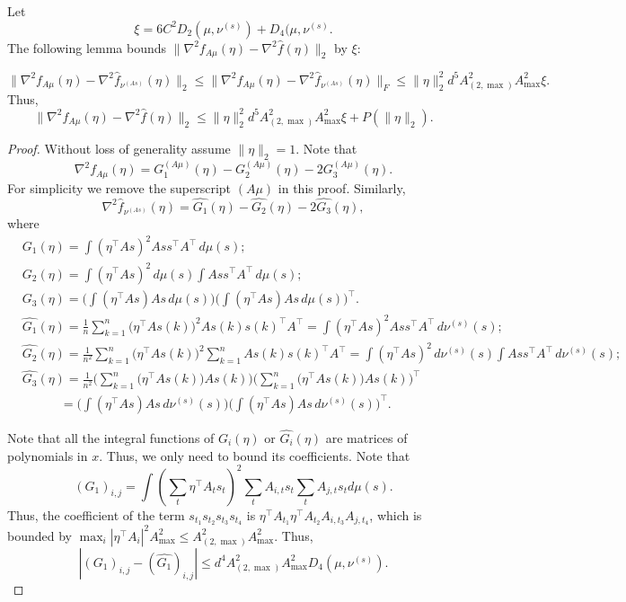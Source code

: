 Let 
\begin{equation}
\label{eq:xi}
\xi = 6C^2D_2(\mu, \nu^{(s)}) + D_4(\mu, \nu^{(s)}.
\end{equation}
The following lemma bounds $\|\nabla^2 f_{A\mu}(\eta) - \nabla^2 \hat{f}(\eta) \|_2$ by $\xi$:
\begin{lemma}
\label{lem:nablavariation}
\[
\|\nabla^2 f_{A\mu}(\eta) - \nabla^2 \widehat{f}_{\nu^{(As)}}(\eta)  \|_2 \le \|\nabla^2 f_{A\mu}(\eta) - \nabla^2 \widehat{f}_{\nu^{(As)}}(\eta)  \|_F\le  \|\eta\|_2^2  d^5 A_{(2,\max)}^2A_{\max}^2\xi.
\]
Thus, 
\[
\|\nabla^2 f_{A\mu}(\eta) - \nabla^2\widehat{f}(\eta)\|_2 \le  \|\eta\|_2^2  d^5 A_{(2,\max)}^2A_{\max}^2\xi + P(\|\eta\|_2).
\]
\end{lemma}
\begin{proof}
Without loss of generality assume $\|\eta\|_2 = 1$.
Note that  
\[
\nabla^2 f_{A\mu}(\eta) = G_1^{(A\mu)}(\eta) - G_2^{(A\mu)}(\eta) -2G_3^{(A\mu)}(\eta).
\]
For simplicity we remove the superscript $(A\mu)$ in this proof. Similarly,
\[
\nabla^2 \widehat{f}_{\nu^{(As)}}(\eta) =\widehat{G_1}(\eta) - \widehat{G_2}(\eta) -2\widehat{G_3}(\eta),
\]
where 
\begin{align*}
& G_1(\eta) = \int (\eta^{\top}As)^2Ass^{\top}A^{\top}\,d\mu(s); \\
& G_2(\eta) = \int (\eta^{\top}As)^2\,d\mu(s) \int Ass^{\top}A^{\top} \,d\mu(s); \\
& G_3(\eta) = \Big(\int (\eta^{\top}As)As\,d\mu(s)\Big)\Big(\int (\eta^{\top}As)As\,d\mu(s)\Big)^{\top}. \\
&\widehat{ G_1}(\eta) = \frac1n\sum_{k=1}^{n} \big(\eta^{\top}As(k)\big)^2As(k)s(k)^{\top}A^{\top} = \int (\eta^{\top}As)^2Ass^{\top}A^{\top}\,d\nu^{(s)}(s); \\
& \widehat{G_2}(\eta) = \frac{1}{n^2}\sum_{k=1}^{n} \big(\eta^{\top}As(k)\big)^2 \sum_{k=1}^{n}As(k)s(k)^{\top}A^{\top} = \int (\eta^{\top}As)^2\,d\nu^{(s)}(s) \int Ass^{\top}A^{\top} \,d\nu^{(s)}(s); \\
& \widehat{G_3}(\eta) = \frac{1}{n^2}\Big(\sum_{k=1}^{n} \big(\eta^{\top}As(k)\big)As(k)\Big) \Big(\sum_{k=1}^{n} \big(\eta^{\top}As(k)\big)As(k)\Big)^{\top} \\
&  \quad \quad \quad = \Big(\int (\eta^{\top}As)As\,d\nu^{(s)}(s)\Big)\Big(\int (\eta^{\top}As)As\,d\nu^{(s)}(s)\Big)^{\top}.
\end{align*}

Note that all the integral functions of $G_i(\eta)$ or $\widehat{G_i}(\eta)$ are matrices of polynomials in $x$. Thus, we only need to bound its coefficients.
Note that 
\[
\left(G_1\right)_{i,j} = \int (\sum_t \eta^{\top}A_ts_t)^2\sum_t A_{i,t}s_t \sum_t A_{j,t}s_t d\mu(s).
\]
Thus, the coefficient of the term $s_{t_1}s_{t_2}s_{t_3}s_{t_4}$ is $\eta^{\top}A_{t_1}\eta^{\top}A_{t_2}A_{i,t_3}A_{j,t_4}$, 
which is bounded by $\max_i |\eta^{\top} A_i|^2 A_{\max}^2 \le A_{(2,\max)}^2A_{\max}^2$. 
Thus,
\[
\left| (G_1)_{i,j} - (\hat{G_1})_{i,j} \right| \le d^4  A_{(2,\max)}^2A_{\max}^2D_4(\mu, \nu^{(s)}).
\]


\end{proof}
